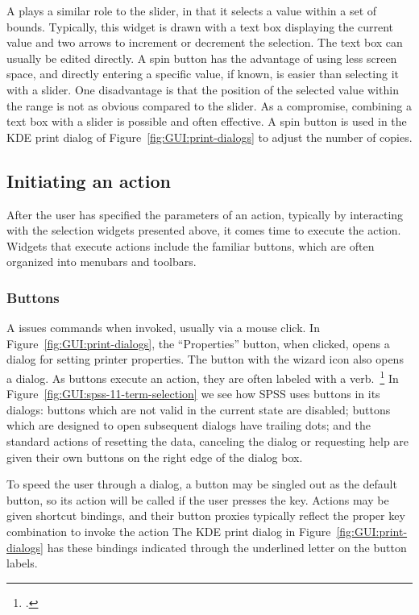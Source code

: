 A  plays a similar role to the slider, in that it
selects a value within a set of bounds. Typically, this widget is
drawn with a text box displaying the current value and two arrows to
increment or decrement the selection. The text box can usually be
edited directly.  A spin button has the advantage of using less screen
space, and directly entering a specific value, if known, is easier
than selecting it with a slider. One disadvantage is that the position
of the selected value within the range is not as obvious compared to
the slider. As a compromise, combining a text box with a slider is
possible and often effective. A spin button is used in the KDE print
dialog of Figure~\ref{fig:GUI:print-dialogs} to adjust the number of
copies.

\subsection{Initiating an action}

After the user has specified the parameters of an action, typically
by interacting with the selection widgets presented above, it comes time to
execute the action. Widgets that execute actions include the familiar
buttons, which are often organized into menubars and toolbars.

\subsubsection{Buttons}
\label{sec:GUI:buttons}

A  issues commands when invoked, usually via a mouse click.
In Figure~\ref{fig:GUI:print-dialogs}, the ``Properties'' button, when
clicked, opens a dialog for setting printer properties. The button
with the wizard icon also opens a dialog.  As buttons execute an
action, they are often labeled with a verb.~\footcite{APPLE:HIG} In
Figure~\ref{fig:GUI:spss-11-term-selection} we see how SPSS uses
buttons in its dialogs: buttons which are not valid in the current
state are disabled; buttons which are designed to open subsequent
dialogs have trailing dots; and the standard actions of resetting the
data, canceling the dialog or requesting help are given their own
buttons on the right edge of the dialog box.

To speed the user through a dialog, a button may be singled out as the
default button, so its action will be called if the user presses the
 key. Actions may be given shortcut bindings, and their
button proxies typically reflect the proper key combination to invoke
the action The KDE print dialog in Figure~\ref{fig:GUI:print-dialogs}
has these bindings indicated through the underlined letter on the
button labels.

